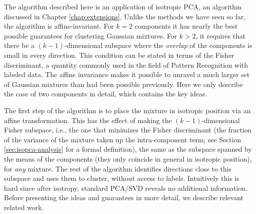 \documentclass{book}
\numberwithin{exercise}{chapter}
\begin{document}
The algorithm described here is an application of isotropic PCA, an algorithm discussed in Chapter \ref{chap:extensions}. Unlike the methods we have seen so far, the algorithm is affine-invariant. For $k=2$ components it has
nearly the best possible guarantees for clustering Gaussian mixtures.  For $k > 2$, it requires
that there be a $(k-1)$-dimensional subspace where the \emph{overlap}
of the components is small in every direction. This condition can be stated in terms of the
Fisher discriminant, a quantity commonly used in the field of Pattern
Recognition with labeled data.  The affine
invariance makes it possible to unravel a much larger set of
Gaussian mixtures than had been possible previously. Here we only describe the
case of two components in detail, which contains the key ideas.

The first step of the algorithm is to place the mixture in isotropic
position via an affine
transformation. This has the effect of making the $(k-1)$-dimensional
Fisher subspace, i.e., the one that minimizes the Fisher discriminant (the fraction of the variance of the mixture taken up the intra-component term; see Section \ref{sec:isopca-analysis} for a formal definition),
the same as the subspace spanned by the means of the components (they
only coincide in general in isotropic position), for {\em any}
mixture. The rest of the algorithm identifies directions close to this
subspace and uses them to cluster, without access to
labels. Intuitively this is hard since after isotropy, standard PCA/SVD
reveals no additional information. Before presenting the ideas and
guarantees in more detail, we describe relevant related work.


\end{document}
